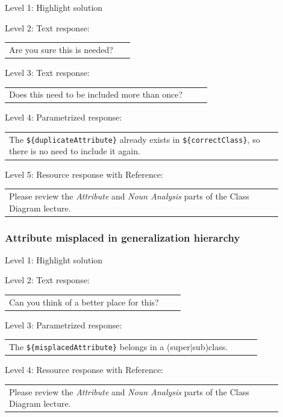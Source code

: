\noindent Level 1: Highlight solution \medskip

\noindent Level 2: Text response: \medskip

\begin{tabular}{|p{0.9\linewidth}}
Are you sure this is needed?
\end{tabular} \medskip

\noindent Level 3: Text response: \medskip

\begin{tabular}{|p{0.9\linewidth}}
Does this need to be included more than once?
\end{tabular} \medskip

\noindent Level 4: Parametrized response: \medskip

\begin{tabular}{|p{0.9\linewidth}}
The \verb|${duplicateAttribute}| already exists in \verb|${correctClass}|, so there is no need to include it again.
\end{tabular} \medskip

\noindent Level 5: Resource response with Reference: \medskip

\begin{tabular}{|p{0.9\linewidth}}
Please review the \textit{Attribute} and \textit{Noun Analysis} parts of the Class Diagram lecture.
\end{tabular} \medskip


\subsubsection{Attribute misplaced in generalization hierarchy}

\noindent Level 1: Highlight solution \medskip

\noindent Level 2: Text response: \medskip

\begin{tabular}{|p{0.9\linewidth}}
Can you think of a better place for this?
\end{tabular} \medskip

\noindent Level 3: Parametrized response: \medskip

\begin{tabular}{|p{0.9\linewidth}}
The \verb|${misplacedAttribute}| belongs in a (super$|$sub)class.
\end{tabular} \medskip

\noindent Level 4: Resource response with Reference: \medskip

\begin{tabular}{|p{0.9\linewidth}}
Please review the \textit{Attribute} and \textit{Noun Analysis} parts of the Class Diagram lecture.
\end{tabular} \medskip


